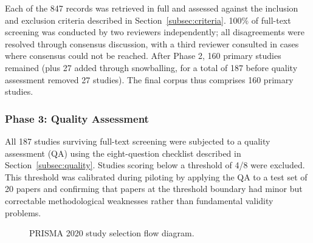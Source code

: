 Each of the 847 records was retrieved in full and assessed against the inclusion and exclusion
criteria described in Section~\ref{subsec:criteria}. 100\% of full-text screening was conducted
by two reviewers independently; all disagreements were resolved through consensus discussion,
with a third reviewer consulted in cases where consensus could not be reached. After Phase 2,
160 primary studies remained (plus 27 added through snowballing, for a total of 187 before
quality assessment removed 27 studies). The final corpus thus comprises 160 primary studies.

\subsubsection{Phase 3: Quality Assessment}

All 187 studies surviving full-text screening were subjected to a quality assessment (QA) using
the eight-question checklist described in Section~\ref{subsec:quality}. Studies scoring below
a threshold of 4/8 were excluded. This threshold was calibrated during piloting by applying the
QA to a test set of 20 papers and confirming that papers at the threshold boundary had minor
but correctable methodological weaknesses rather than fundamental validity problems.

\begin{figure}[h]
\centering
{}
\caption{PRISMA 2020 study selection flow diagram.}
\label{fig:prisma}
\end{figure}

